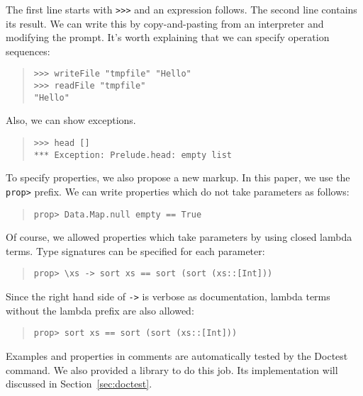 \documentclass[preprint]{sigplanconf}
\newcommand{\doctest}{Doctest}
\begin{document}
\noindent The first line starts with {\tt >>>} and an expression follows. The second line contains its result. We can write this by copy-and-pasting from an interpreter and modifying the prompt.
It's worth explaining that we can specify operation sequences:

\begin{quote}
\small
\begin{verbatim}
>>> writeFile "tmpfile" "Hello"
>>> readFile "tmpfile"
"Hello"
\end{verbatim}
\end{quote}

\noindent Also, we can show exceptions.

\begin{quote}
\small
\begin{verbatim}
>>> head []
*** Exception: Prelude.head: empty list
\end{verbatim}
\end{quote}

To specify properties, we also propose a new markup. In this paper, we use the {\tt prop>} prefix. We can write properties which do not take parameters as follows:

\begin{quote}
\small
\begin{verbatim}
prop> Data.Map.null empty == True
\end{verbatim}
\end{quote}

\noindent Of course, we allowed properties which take parameters by
using closed lambda terms.
Type signatures can be specified for each parameter:

\begin{quote}
\small
\begin{verbatim}
prop> \xs -> sort xs == sort (sort (xs::[Int]))
\end{verbatim}
\end{quote}

\noindent Since the right hand side of {\tt ->} is verbose as documentation,
lambda terms without the lambda prefix are also allowed:

\begin{quote}
\small
\begin{verbatim}
prop> sort xs == sort (sort (xs::[Int]))
\end{verbatim}
\end{quote}

Examples and properties in comments are automatically
tested by the \doctest{} command. We also provided a library
to do this job. Its implementation will discussed in Section~\ref{sec:doctest}.
\end{document}
